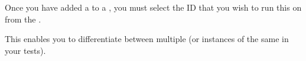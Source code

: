 Once you have added a \gdsuite{} to a \gdjob{} , you must select the \gdaut{} ID that you wish to run this \gdsuite{} on from the \gdpropview{}. 

This enables you to differentiate between multiple \gdauts{} (or instances of the same \gdaut{} in your tests). 



